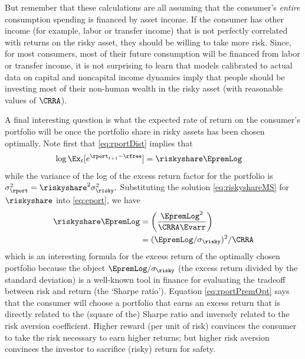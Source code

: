 But remember that these calculations are all assuming that the consumer's \textit{entire} consumption spending is financed by asset income.  If the consumer has other income (for example, labor or transfer income) that is not perfectly correlated with returns on the risky asset, they should be willing to take more risk.  Since, for most consumers, most of their future consumption will be financed from labor or transfer income, it is not surprising to learn that models calibrated to actual data on capital and noncapital income dynamics imply that people should be investing most of their non-human wealth in the risky asset (with reasonable values of $\CRRA$).




A final interesting question is what the expected rate of return on
the consumer's portfolio will be once the portfolio share in risky
assets has been chosen optimally.  Note first that \eqref{eq:rportDist}
implies that
\begin{equation}\begin{gathered}\begin{aligned}
  \log \Ex_{t}[e^{\rport_{t+1}-\rfree}] & =  \riskyshare \EpremLog  \label{eq:eport}
\end{aligned}\end{gathered}\end{equation}
while the variance of the log of the excess return factor for the portfolio is $\sigma^{2}_{\rport} = \riskyshare^{2} \sigma^{2}_{\risky}.$  Substituting the solution \eqref{eq:riskyshareMS} for $\riskyshare$ into \eqref{eq:eport}, we have
\begin{equation}\begin{gathered}\begin{aligned}
  \riskyshare \EpremLog & =  \left(\frac{\EpremLog^{2}}{\CRRA \Evarr}\right)  \notag
\\ & =   (\EpremLog/\sigma_{\risky})^{2}/\CRRA \label{eq:rportPremOpt}
\end{aligned}\end{gathered}\end{equation}
which is an interesting formula for the excess return of the optimally
chosen portfolio because the object $\EpremLog/\sigma_{\risky}$ (the
excess return divided by the standard deviation) is a well-known tool
in finance for evaluating the tradeoff between risk and return (the
`Sharpe ratio').  Equation \eqref{eq:rportPremOpt} says that the consumer will
choose a portfolio that earns an excess return that is directly
related to the (square of the) Sharpe ratio and inversely related to the risk aversion
coefficient.  Higher reward (per unit of risk) convinces the consumer
to take the risk necessary to earn higher returns; but higher risk
aversion convinces the investor to sacrifice (risky) return for safety.

